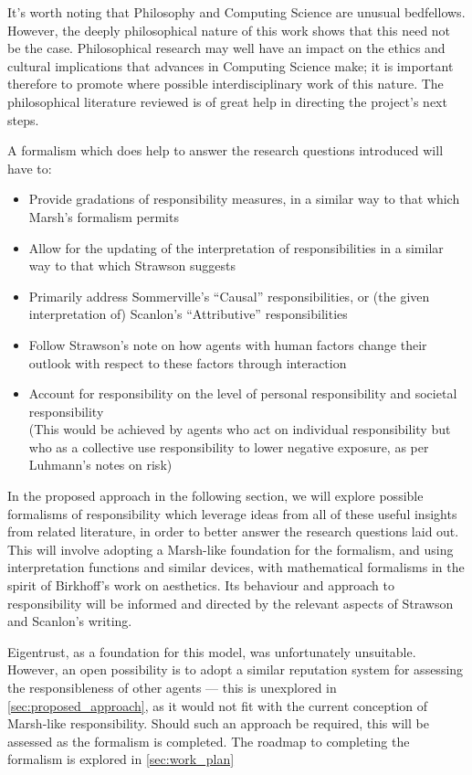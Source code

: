 It's worth noting that Philosophy and Computing Science are unusual bedfellows. However, the deeply philosophical nature of this work shows that this need not be the case. Philosophical research may well have an impact on the ethics and cultural implications that advances in Computing Science make; it is important therefore to promote where possible interdisciplinary work of this nature. The philosophical literature reviewed is of great help in directing the project's next steps.\par

A formalism which does help to answer the research questions introduced will have to:

\begin{itemize}
    \item Provide gradations of responsibility measures, in a similar way to that which Marsh's formalism permits
    \item Allow for the updating of the interpretation of responsibilities in a similar way to that which Strawson suggests
    \item Primarily address Sommerville's ``Causal'' responsibilities, or (the given interpretation of) Scanlon's ``Attributive'' responsibilities
    \item Follow Strawson's note on how agents with human factors change their outlook with respect to these factors through interaction
    \item Account for responsibility on the level of personal responsibility and societal responsibility\\
        (This would be achieved by agents who act on individual responsibility but who as a collective use responsibility to lower negative exposure, as per Luhmann's notes on risk)
\end{itemize}

In the proposed approach in the following section, we will explore possible formalisms of responsibility which leverage ideas from all of these useful insights from related literature, in order to better answer the research questions laid out. This will involve adopting a Marsh-like foundation for the formalism, and using interpretation functions and similar devices, with mathematical formalisms in the spirit of Birkhoff's work on aesthetics. Its behaviour and approach to responsibility will be informed and directed by the relevant aspects of Strawson and Scanlon's writing.\par

Eigentrust, as a foundation for this model, was unfortunately unsuitable. However, an open possibility is to adopt a similar reputation system for assessing the responsibleness of other agents --- this is unexplored in \cref{sec:proposed_approach}, as it would not fit with the current conception of Marsh-like responsibility. Should such an approach be required, this will be assessed as the formalism is completed. The roadmap to completing the formalism is explored in \cref{sec:work_plan}

